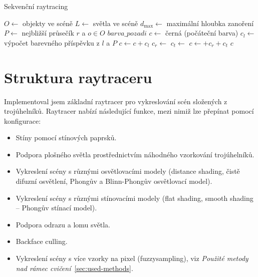 \documentclass[10pt,a4paper]{article}
\begin{document}
\begin{algorithm}[H]
\caption{Sekvenční raytracing}
\label{alg:raytracing}
\begin{algorithmic}[1]
    \State $O \gets$ objekty ve scéně
    \State $L \gets$ světla ve scéně
    \State $d_{\text{max}} \gets$ maximální hloubka zanoření
        \State $P \gets$ nejbližší průsečík $r$ a $o \in O$
            \State \Return $barva\_pozadi$
        \EndIf
        \State $c \gets$ černá (počáteční barva)
                \State $c_l \gets$ výpočet barevného příspěvku z $l$ a $P$
                \State $c \gets c + c_l$
            \EndIf
        \EndFor
            \State $c_r \gets$ 
            \State $c_t \gets$ 
            \State $c \gets + c_r + c_t$
        \EndIf
        \State \Return $c$
    \EndFunction
\end{algorithmic}
\end{algorithm}


\section{Struktura raytraceru}

Implementoval jsem základní raytracer pro vykreslování scén složených z trojúhelníků. Raytracer nabízí následující funkce, mezi nimiž lze přepínat pomocí konfigurace:

\begin{itemize}
    \item Stíny pomocí stínových paprsků.
    \item Podpora plošného světla prostřednictvím náhodného vzorkování trojúhelníků.
    \item Vykreslení scény s různými osvětlovacími modely (distance shading, čistě difuzní osvětlení, Phongův a Blinn-Phongův osvětlovací model).
    \item Vykreslení scény s různými stínovacími modely (flat shading, smooth shading – Phongův stínací model).
    \item Podpora odrazu a lomu světla.
    \item Backface culling.
    \item Vykreslení scény s více vzorky na pixel (fuzzysampling), viz \textit{Použité metody nad rámec cvičení}~\ref{sec:used-methods}.
\end{itemize}
\end{document}
